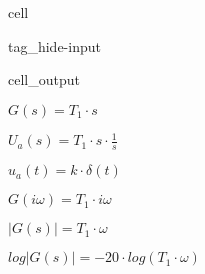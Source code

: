 \documentclass[letterpaper,10pt,english]{jupyterBook}
\begin{document}
\begin{sphinxuseclass}{cell}
\begin{sphinxuseclass}{tag_hide-input}\begin{sphinxVerbatimOutput}

\begin{sphinxuseclass}{cell_output}
\noindent{}

\end{sphinxuseclass}\end{sphinxVerbatimOutput}

\end{sphinxuseclass}
\end{sphinxuseclass}
\begin{DUlineblock}{0em}
\item[] 
\end{DUlineblock}

\begin{DUlineblock}{0em}
\item[] 
\end{DUlineblock}

\sphinxAtStartPar
\(G(s) = T_1\cdot s\)

\begin{DUlineblock}{0em}
\item[] 
\end{DUlineblock}

\sphinxAtStartPar
\(U_a(s) = T_1\cdot s\cdot\frac{1}{s}\)

\sphinxAtStartPar
\(u_a(t) = k\cdot \delta(t)\)

\begin{DUlineblock}{0em}
\item[] 
\end{DUlineblock}

\sphinxAtStartPar
\(G(i\omega) = T_1 \cdot i\omega\)

\begin{DUlineblock}{0em}
\item[] 
\end{DUlineblock}

\sphinxAtStartPar
\(|G(s)| = T_1\cdot\omega\)

\sphinxAtStartPar
\(log|G(s)| = - 20\cdot log(T_1\cdot\omega)\)

\begin{DUlineblock}{0em}
\item[] 
\end{DUlineblock}
\end{document}
